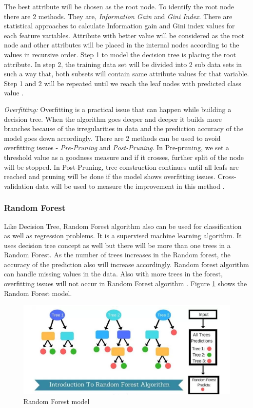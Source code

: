 \documentclass[sigconf]{acmart}
\begin{document}
The best attribute will be chosen as the root node. To identify the root node there are 2 methods. They are, \emph{Information Gain} and \emph{Gini Index}. There are statistical approaches to calculate Information gain and Gini index values for each feature variables. Attribute with better value will be considered as the root node and other attributes will be placed in the internal nodes according to the values in recursive order. Step 1 to model the decision tree is placing the root attribute. In step 2, the training data set will be divided into 2 sub data sets in such a way that, both subsets will contain same attribute values for that variable. Step 1 and 2 will be repeated until we reach the leaf nodes with predicted class value \cite{decision-tree}.

\textit{Overfitting:} Overfitting is a practical issue that can happen while building a decision tree. When the algorithm goes deeper and deeper it builds more branches because of the irregularities in data and the prediction accuracy of the model goes down accordingly. There are 2 methods can be used to avoid overfitting issues - \emph{Pre-Pruning} and \emph{Post-Pruning}. In Pre-pruning, we set a threshold value as a goodness measure and if it crosses, further split of the node will be stopped. In Post-Pruning, tree construction continues until all leafs are reached and pruning will be done if the model shows overfitting issues. Cross-validation data will be used to measure the improvement in this method \cite{decision-tree}.

\subsubsection{Random Forest}\label{Random Forest}

Like Decision Tree, Random Forest algorithm also can be used for classification as well as regression problems. It is a supervised machine learning algorithm. It uses decision tree concept as well but there will be more than one trees in a Random Forest. As the number of trees increases in the Random forest, the accuracy of the prediction also will increase accordingly. Random forest algorithm can handle missing values in the data. Also with more trees in the forest, overfitting issues will not occur in Random Forest algorithm \cite{random-forest}. Figure \ref{fig:Figure3} shows the Random Forest model.

\begin{figure}[htb]
  \centering
  \includegraphics[width=1.0\columnwidth]{images/Figure3.png}
  \caption{Random Forest model
  \cite{random-forest}}
  \label{fig:Figure3} 
\end{figure}
\end{document}
